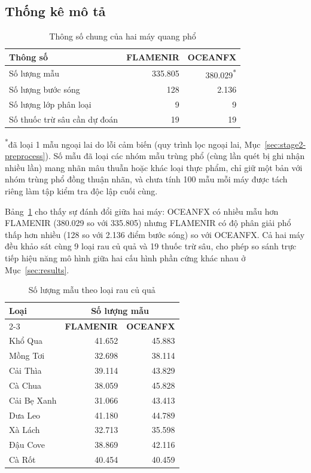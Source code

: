 \documentclass[10pt,twocolumn,twoside]{article}
\begin{document}
\subsection{Thống kê mô tả}
\label{sec:overview-stats}

\begin{table}[htbp]
\centering
\caption{Thông số chung của hai máy quang phổ}
\label{tab:overview-stats}
\footnotesize
\begin{tabular}{|l|r|r|}
\hline
\textbf{Thông số} & \textbf{FLAMENIR} & \textbf{OCEANFX} \\
\hline
Số lượng mẫu & 335.805 & 380.029\textsuperscript{*} \\
Số lượng bước sóng & 128 & 2.136 \\
Số lượng lớp phân loại & 9 & 9 \\
Số thuốc trừ sâu cần dự đoán & 19 & 19 \\
\hline
\end{tabular}

\vspace{2pt}
{\footnotesize \textsuperscript{*}đã loại 1 mẫu ngoại lai do lỗi cảm biến
(quy trình lọc ngoại lai, Mục~\ref{sec:stage2-preprocess}). Số mẫu đã loại
các nhóm mẫu trùng phổ (cùng lần quét bị ghi nhận nhiều lần) mang nhãn mâu
thuẫn hoặc khác loại thực phẩm, chỉ giữ một bản với nhóm trùng phổ đồng
thuận nhãn, và chưa tính 100 mẫu mỗi máy được tách riêng làm tập kiểm tra
độc lập cuối cùng.}
\end{table}

Bảng~\ref{tab:overview-stats} cho thấy sự đánh đổi giữa hai máy: OCEANFX có
nhiều mẫu hơn FLAMENIR (380.029 so với 335.805) nhưng FLAMENIR có độ phân
giải phổ thấp hơn nhiều (128 so với 2.136 điểm bước sóng) so với OCEANFX. Cả
hai máy đều khảo sát cùng 9 loại rau củ
quả và 19 thuốc trừ sâu, cho phép so sánh trực tiếp hiệu năng mô hình giữa
hai cấu hình phần cứng khác nhau ở Mục~\ref{sec:results}.

\begin{table}[htbp]
\centering
\caption{Số lượng mẫu theo loại rau củ quả}
\label{tab:cat-counts}
\footnotesize
\begin{tabular}{|l|r|r|}
\hline
\multirow{2}{*}{\textbf{Loại}} & \multicolumn{2}{c|}{\textbf{Số lượng mẫu}} \\
\cline{2-3}
 & \textbf{FLAMENIR} & \textbf{OCEANFX} \\
\hline
Khổ Qua      & 41.652 & 45.883 \\
Mồng Tơi     & 32.698 & 38.114 \\
Cải Thìa     & 39.114 & 43.829 \\
Cà Chua      & 38.059 & 45.828 \\
Cải Bẹ Xanh  & 31.066 & 43.413 \\
Dưa Leo      & 41.180 & 44.789 \\
Xà Lách      & 32.713 & 35.598 \\
Đậu Cove     & 38.869 & 42.116 \\
Cà Rốt       & 40.454 & 40.459 \\
\hline
\end{tabular}
\end{table}
\end{document}
